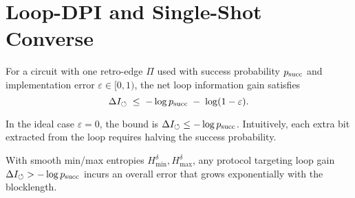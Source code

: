 
\section{Loop-DPI and Single-Shot Converse}
\begin{theorem}
For a circuit with one retro-edge $\Pi$ used with success probability $p_{\mathrm{succ}}$ and implementation error $\varepsilon\in[0,1)$, the net loop information gain satisfies
\[
\Delta I_{\circlearrowleft} \;\le\; -\log p_{\mathrm{succ}} \;-\; \log(1-\varepsilon).
\]
\end{theorem}

\begin{remark}
In the ideal case $\varepsilon=0$, the bound is $\Delta I_{\circlearrowleft}\le -\log p_{\mathrm{succ}}$. Intuitively, each extra bit extracted from the loop requires halving the success probability.
\end{remark}

\begin{theorem}
With smooth min/max entropies $H_{\min}^{\delta}, H_{\max}^{\delta}$, any protocol targeting loop gain $\Delta I_{\circlearrowleft}> -\log p_{\mathrm{succ}}$ incurs an overall error that grows exponentially with the blocklength.
\end{theorem}
